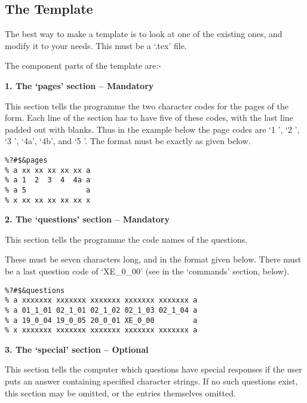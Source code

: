 \subsection{The Template}

The best way to make a template is to look at one of the existing ones, and
modify it to your needs. This must be a `.tex' file. 

The component parts of the template are:-


\vspace*{0.2cm}
{\bf \large 1. The `pages' section -- Mandatory}
\vspace*{0.2cm}

This section tells the programme the two character codes for the pages of
the form. Each line of the section has to have five of these codes, with
the last line padded out with blanks. Thus in the example below the page
codes are `1 ', `2 ', `3 ', `4a', `4b', and `5 '. The format must be
exactly as given below. 

\begin{verbatim}
%?#$&pages
% a xx xx xx xx xx a
% a 1  2  3  4  4a a
% a 5              a
% x xx xx xx xx xx x
\end{verbatim}

\vspace*{0.2cm}
{\bf \large 2. The `questions' section -- Mandatory}
\vspace*{0.2cm}

This section tells the programme the code names of the questions. 

These must be seven characters long, and in the format given below. There
must be a last question code of `XE\_0\_00' (see in the `commands' section,
below). 

\begin{verbatim}
%?#$&questions
% a xxxxxxx xxxxxxx xxxxxxx xxxxxxx xxxxxxx a
% a 01_1_01 02_1_01 02_1_02 02_1_03 02_1_04 a
% a 19_0_04 19_0_05 20_0_01 XE_0_00         a
% x xxxxxxx xxxxxxx xxxxxxx xxxxxxx xxxxxxx a
\end{verbatim}

\vspace*{0.2cm}
{\bf \large 3. The `special' section -- Optional}
\vspace*{0.2cm}

This section tells the computer which questions have special responses if
the user puts an answer containing specified character strings. If no such
questions exist, this section may be omitted, or the entries themselves
omitted. 

